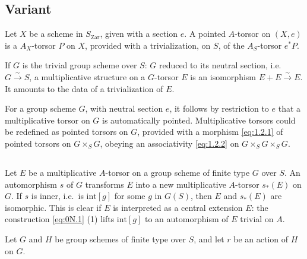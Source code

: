 \documentclass[11pt,a4paper]{article}
\theoremstyle{plain}
\theoremstyle{definition}
\newcommand{\intg}{\mathrm{int}}
\newcommand{\Zar}{\mathrm{Zar}}
\begin{document}
\subsection{Variant}
Let $X$ be a scheme in $S_{\Zar}$, given with a section $e$. A pointed $A$-torsor on $(X,e)$ is a $A_X$-torsor $P$ on $X$, provided with a trivialization, on $S$, of the $A_S$-torsor $e^*P$.

If $G$ is the trivial group scheme over $S$: $G$ reduced to its neutral section, i.e.~$G \xrightarrow{\sim} S$, a multiplicative structure on a $G$-torsor $E$ is an isomorphism $E + E \xrightarrow{\sim} E$. It amounts to the data of a trivialization of $E$.

For a group scheme $G$, with neutral section $e$, it follows by restriction to $e$ that a multiplicative torsor on $G$ is automatically pointed. Multiplicative torsors could be redefined as pointed torsors on $G$, provided with a morphism \eqref{eq:1.2.1} of pointed torsors on $G \times_S G$, obeying an associativity \eqref{eq:1.2.2} on $G \times_S G \times_S G$.

\subsection{}
Let $E$ be a multiplicative $A$-torsor on a group scheme of finite type $G$ over $S$. An automorphism $s$ of $G$ transforms $E$ into a new multiplicative $A$-torsor $s_*(E)$ on $G$. If $s$ is inner, i.e.~is $\intg[g]$ for some $g$ in $G(S)$, then $E$ and $s_*(E)$ are isomorphic. This is clear if $E$ is interpreted as a central extension $E$: the construction \eqref{eq:0N.1} (1) lifts $\intg[g]$ to an automorphism of $E$ trivial on $A$.

Let $G$ and $H$ be group schemes of finite type over $S$, and let $r$ be an action of $H$ on $G$.
\end{document}
